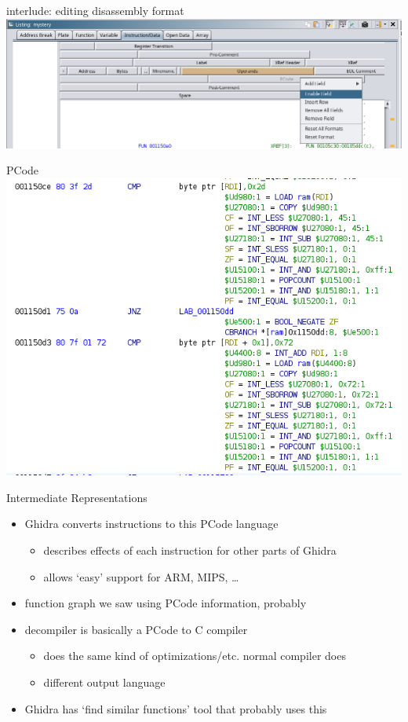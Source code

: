 \begin{frame}{interlude: editing disassembly format}
\includegraphics[width=\textwidth]{../re-tools/ghidra-enable-show-pcode}
\end{frame}

\begin{frame}{PCode}
\includegraphics[height=0.9\textheight]{../re-tools/ghidra-pcode-ex}
\end{frame}

\begin{frame}{Intermediate Representations}
\begin{itemize}
\item Ghidra converts instructions to this PCode language
    \begin{itemize}
    \item describes effects of each instruction for other parts of Ghidra
    \item allows `easy' support for ARM, MIPS, \ldots
    \end{itemize}
\item function graph we saw using PCode information, probably
\item decompiler is basically a PCode to C compiler
    \begin{itemize}
    \item does the same kind of optimizations/etc. normal compiler does
    \item different output language
    \end{itemize}
\item Ghidra has `find similar functions' tool that probably uses this
\end{itemize}
\end{frame}


